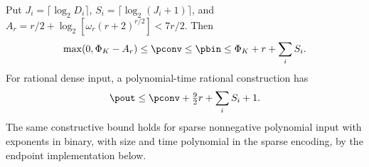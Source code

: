\begin{theorem}\label{thm:positive-loglog}
Put $J_i=\lceil\log_2D_i\rceil$,
$S_i=\lceil\log_2(J_i+1)\rceil$, and
$A_r=r/2+\log_2[\omega_r(r+2)^{r/2}]<7r/2$. Then
\begin{equation}\label{eq:positive-loglog-law}
 \max(0,\Phi_K-A_r)\le\pconv\le\pbin
 \le\Phi_K+r+\sum_iS_i.
\end{equation}
For rational dense input, a polynomial-time rational construction has
\begin{equation}\label{eq:positive-loglog-count}
 \pout\le\pconv+\tfrac92r+\sum_iS_i+1.
\end{equation}
The same constructive bound holds for sparse nonnegative polynomial
input with exponents in binary, with size and time polynomial in the
sparse encoding, by the endpoint implementation below.
\end{theorem}
